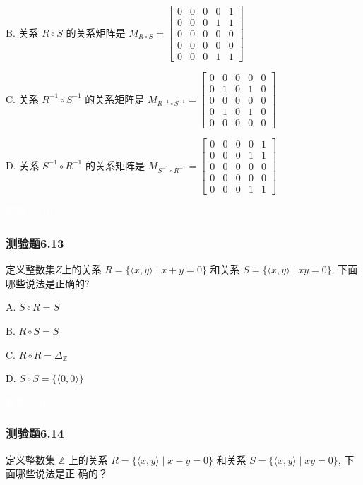 \documentclass[UTF8, heading=true]{ctexart}
\begin{document}
B. 关系 $R \circ S$ 的关系矩阵是 $M_{R \circ S}=\left[\begin{array}{lllll}0 & 0 & 0 & 0 & 1 \\ 0 & 0 & 0 & 1 & 1 \\ 0 & 0 & 0 & 0 & 0 \\ 0 & 0 & 0 & 0 & 0 \\ 0 & 0 & 0 & 1 & 1\end{array}\right]$

C. 关系 $R^{-1} \circ S^{-1}$ 的关系矩阵是 $M_{R^{-1} \circ S^{-1}}=\left[\begin{array}{lllll}0 & 0 & 0 & 0 & 0 \\ 0 & 1 & 0 & 1 & 0 \\ 0 & 0 & 0 & 0 & 0 \\ 0 & 1 & 0 & 1 & 0 \\ 0 & 0 & 0 & 0 & 0\end{array}\right]$

D. 关系 $S^{-1} \circ R^{-1}$ 的关系矩阵是 $M_{S^{-1} \circ R^{-1}}=\left[\begin{array}{ccccc}0 & 0 & 0 & 0 & 1 \\ 0 & 0 & 0 & 1 & 1 \\ 0 & 0 & 0 & 0 & 0 \\ 0 & 0 & 0 & 0 & 0 \\ 0 & 0 & 0 & 1 & 1\end{array}\right]$

\textcolor{white}{答案：ABC}




\subsubsection{测验题6.13}
定义整数集$Z$上的关系 $R=\{\langle x, y\rangle \mid x+y=0\}$ 和关系 $S=\{\langle x, y\rangle \mid x y=0\}$. 下面哪些说法是正确的?

A. 
$
S \circ R=S
$

B. 
$
R \circ S=S
$

C. 
$
R \circ R=\Delta_{\mathbb{Z}}
$

D. 
$
S \circ S=\{\langle 0,0\rangle\}
$

\textcolor{white}{答案：ABC}

\subsubsection{测验题6.14}

定义整数集 $\mathbb{Z}$ 上的关系 $R=\{\langle x, y\rangle \mid x-y=0\}$ 和关系 $S=\{\langle x, y\rangle \mid x y=0\}$, 下面哪些说法是正
确的？
\end{document}

